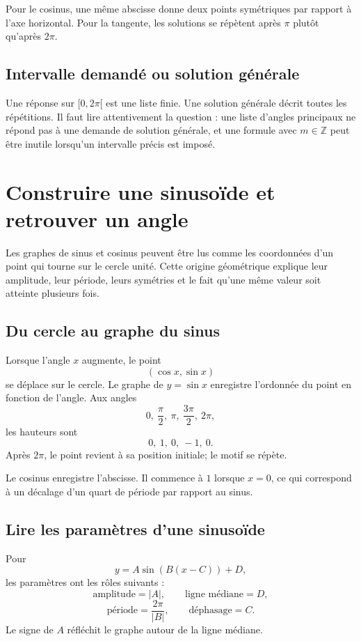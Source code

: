 \documentclass[12pt,a4paper,openany]{book}
\newcommand{\abs}[1]{\left\lvert #1\right\rvert}
\begin{document}
Pour le cosinus, une même abscisse donne deux points symétriques par rapport à l'axe horizontal. Pour la tangente, les solutions se répètent après $\pi$ plutôt qu'après $2\pi$.

\subsection{Intervalle demandé ou solution générale}
Une réponse sur $[0,2\pi[$ est une liste finie. Une solution générale décrit toutes les répétitions. Il faut lire attentivement la question : une liste d'angles principaux ne répond pas à une demande de solution générale, et une formule avec $m\in\mathbb Z$ peut être inutile lorsqu'un intervalle précis est imposé.


\section{Construire une sinusoïde et retrouver un angle}

Les graphes de sinus et cosinus peuvent être lus comme les coordonnées d'un point qui tourne sur le cercle unité. Cette origine géométrique explique leur amplitude, leur période, leurs symétries et le fait qu'une même valeur soit atteinte plusieurs fois.

\subsection{Du cercle au graphe du sinus}

Lorsque l'angle $x$ augmente, le point
\[
(\cos x,\sin x)
\]
se déplace sur le cercle. Le graphe de $y=\sin x$ enregistre l'ordonnée du point en fonction de l'angle. Aux angles
\[
0,\ \frac\pi2,\ \pi,\ \frac{3\pi}2,\ 2\pi,
\]
les hauteurs sont
\[
0,\ 1,\ 0,\ -1,\ 0.
\]
Après $2\pi$, le point revient à sa position initiale; le motif se répète.

Le cosinus enregistre l'abscisse. Il commence à $1$ lorsque $x=0$, ce qui correspond à un décalage d'un quart de période par rapport au sinus.

\subsection{Lire les paramètres d'une sinusoïde}

Pour
\[
y=A\sin(B(x-C))+D,
\]
les paramètres ont les rôles suivants :
\[
\text{amplitude}=\abs A,
\qquad
\text{ligne médiane}=D,
\]
\[
\text{période}=\frac{2\pi}{\abs B},
\qquad
\text{déphasage}=C.
\]
Le signe de $A$ réfléchit le graphe autour de la ligne médiane.
\end{document}
